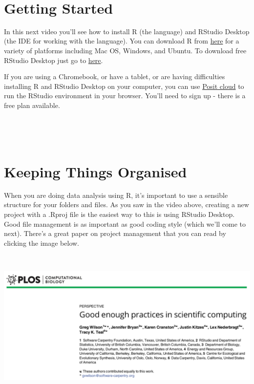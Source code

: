 \documentclass[
]{book}
\begin{document}
~~

\hypertarget{getting-started}{%
\section{Getting Started}\label{getting-started}}

In this next video you'll see how to install R (the language) and RStudio Desktop (the IDE for working with the language). You can download R from \href{https://www.r-project.org}{here} for a variety of platforms including Mac OS, Windows, and Ubuntu. To download free RStudio Desktop just go to \href{https://posit.co}{here}.

If you are using a Chromebook, or have a tablet, or are having difficulties installing R and RStudio Desktop on your computer, you can use \href{https://posit.cloud/plans/free}{Posit cloud} to run the RStudio environment in your browser. You'll need to sign up - there is a free plan available.

~~

~~

\hypertarget{keeping-things-organised}{%
\section{Keeping Things Organised}\label{keeping-things-organised}}

When you are doing data analysis using R, it's important to use a sensible structure for your folders and files. As you saw in the video above, creating a new project with a .Rproj file is the easiest way to this is using RStudio Desktop. Good file management is as important as good coding style (which we'll come to next). There's a great paper on project management that you can read by clicking the image below.

~~

\href{https://journals.plos.org/ploscompbiol/article/file?id=10.1371/journal.pcbi.1005510\&type=printable}{\includegraphics{images/wilson_paper.png}}
\end{document}
